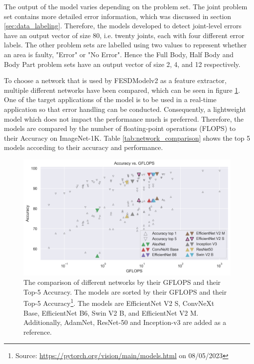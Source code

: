 The output of the model varies depending on the problem set. The joint problem set contains more detailed error information, which was discussed in section \ref{sec:data_labeling}. Therefore, the models developed to detect joint-level errors have an output vector of size 80, i.e. twenty joints, each with four different error labels. The other problem sets are labelled using two values to represent whether an area is faulty, "Error" or "No Error". Hence the Full Body, Half Body and Body Part problem sets have an output vector of size 2, 4, and 12 respectively.

To choose a network that is used by FESDModelv2 as a feature extractor, multiple different networks have been compared, which can be seen in figure \ref{fig:network_comparison}. One of the target applications of the model is to be used in a real-time application so that error handling can be conducted. Consequently, a lightweight model which does not impact the performance much is preferred. Therefore, the models are compared by the number of floating-point operations (FLOPS) to their Accuracy on ImageNet-1K. Table \ref{tab:network_comparison} shows the top 5 models according to their accuracy and performance. 

\begin{figure}[ht]
  \centering
  \includegraphics[width=.8\linewidth]{figures/network/networks.png}
  \caption[Network comparison]{The comparison of different networks by their GFLOPS and their Top-5 Accuracy. The models are sorted by their GFLOPS and their Top-5 Accuracy\footnote{Source: \url{https://pytorch.org/vision/main/models.html} on 08/05/2023}. The models are EfficientNet V2 S, ConvNeXt Base, EfficientNet B6, Swin V2 B, and EfficientNet V2 M. Additionally, AdamNet, ResNet-50 and Inception-v3 are added as a reference.}
  \label{fig:network_comparison}
\end{figure}

